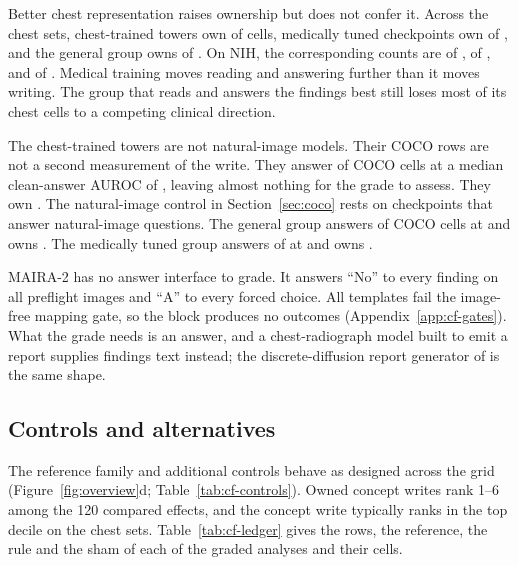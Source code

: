 Better chest representation raises ownership but does not confer it. Across the chest sets, chest-trained towers own \cfSpecTowerOwned{} of \cfSpecTowerN{} cells, medically tuned checkpoints own \cfSpecMedOwned{} of \cfSpecMedN{}, and the general group owns \cfSpecGenOwned{} of \cfSpecGenN{}. On NIH, the corresponding counts are \cfSpecNihTowerOwned{} of \cfSpecNihTowerN{}, \cfSpecNihMedOwned{} of \cfSpecNihMedN{}, and \cfSpecNihGenOwned{} of \cfSpecNihGenN{}. Medical training moves reading and answering further than it moves writing. The group that reads and answers the findings best still loses most of its chest cells to a competing clinical direction.

The chest-trained towers are not natural-image models. Their COCO rows are not a second measurement of the write. They answer \cfSpecTowerCocoAnswerable{} of \cfSpecTowerCocoN{} COCO cells at a median clean-answer AUROC of \cfSpecTowerCocoAnsAuroc{}, leaving almost nothing for the grade to assess. They own \cfSpecTowerCocoOwned{}. The natural-image control in Section~\ref{sec:coco} rests on checkpoints that answer natural-image questions. The general group answers \cfSpecGenCocoAnswerable{} of \cfSpecGenCocoN{} COCO cells at \cfSpecGenCocoAnsAuroc{} and owns \cfSpecGenCocoOwned{}. The medically tuned group answers \cfSpecMedCocoAnswerable{} of \cfSpecMedCocoN{} at \cfSpecMedCocoAnsAuroc{} and owns \cfSpecMedCocoOwned{}.

MAIRA-2 \citep{bannur2024maira} has no answer interface to grade. It answers ``No'' to every finding on all \cfSpecUngradedRows{} preflight images and ``A'' to every forced choice. All \cfSpecUngradedTemplatesWord{} templates fail the image-free mapping gate, so the block produces no outcomes (Appendix~\ref{app:cf-gates}). What the grade needs is an answer, and a chest-radiograph model built to emit a report supplies findings text instead; the discrete-diffusion report generator of \citet{chen2026echo} is the same shape.

\subsection{Controls and alternatives}
\label{sec:controls}

The reference family and additional controls behave as designed across the grid (Figure~\ref{fig:overview}d; Table~\ref{tab:cf-controls}). Owned concept writes rank 1--6 among the 120 compared effects, and the concept write typically ranks in the top decile on the chest sets. Table~\ref{tab:cf-ledger} gives the rows, the reference, the rule and the sham of each of the \cfLedgerAnalyses{} graded analyses and their \cfLedgerCells{} cells.

